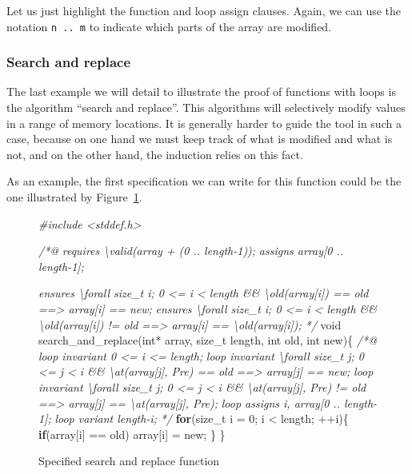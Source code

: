 \documentclass[12pt,francais,]{scrbook}
\newenvironment{Shaded}{}{}
\newcommand{\KeywordTok}[1]{\textcolor[rgb]{0.00,0.44,0.13}{\textbf{{#1}}}}
\newcommand{\DataTypeTok}[1]{\textcolor[rgb]{0.56,0.13,0.00}{{#1}}}
\newcommand{\DecValTok}[1]{\textcolor[rgb]{0.25,0.63,0.44}{{#1}}}
\newcommand{\CommentTok}[1]{\textcolor[rgb]{0.38,0.63,0.69}{\textit{{#1}}}}
\newcommand{\NormalTok}[1]{{#1}}
\begin{document}
Let us just highlight the function and loop assign clauses. Again, we
can use the notation \texttt{n\ ..\ m} to indicate which parts of the
array are modified.

\subsubsection{Search and replace}\label{search-and-replace}

The last example we will detail to illustrate the proof of functions
with loops is the algorithm ``search and replace''. This algorithms will
selectively modify values in a range of memory locations. It is
generally harder to guide the tool in such a case, because on one hand
we must keep track of what is modified and what is not, and on the other
hand, the induction relies on this fact.

As an example, the first specification we can write for this function
could be the one illustrated by Figure~\ref{fig:4-4-2-2-sar}.

\begin{figure}[htbp]
  \centering
\begin{footnotesize}\begin{Shaded}
\begin{Highlighting}[]
\CommentTok{#include <stddef.h>}

\CommentTok{/*@}
\CommentTok{  requires \textbackslash{}valid(array + (0 .. length-1));}
\CommentTok{  assigns array[0 .. length-1];}

\CommentTok{  ensures \textbackslash{}forall size_t i; 0 <= i < length && \textbackslash{}old(array[i]) == old}
\CommentTok{             ==> array[i] == new;}
\CommentTok{  ensures \textbackslash{}forall size_t i; 0 <= i < length && \textbackslash{}old(array[i]) != old }
\CommentTok{             ==> array[i] == \textbackslash{}old(array[i]);}
\CommentTok{*/}
\DataTypeTok{void} \NormalTok{search_and_replace(}\DataTypeTok{int}\NormalTok{* array, size_t length, }\DataTypeTok{int} \NormalTok{old, }\DataTypeTok{int} \NormalTok{new)\{}
  \CommentTok{/*@}
\CommentTok{    loop invariant 0 <= i <= length;}
\CommentTok{    loop invariant \textbackslash{}forall size_t j; 0 <= j < i && \textbackslash{}at(array[j], Pre) == old }
\CommentTok{                     ==> array[j] == new;}
\CommentTok{    loop invariant \textbackslash{}forall size_t j; 0 <= j < i && \textbackslash{}at(array[j], Pre) != old }
\CommentTok{                     ==> array[j] == \textbackslash{}at(array[j], Pre);}
\CommentTok{    loop assigns i, array[0 .. length-1];}
\CommentTok{    loop variant length-i;}
\CommentTok{  */}
  \KeywordTok{for}\NormalTok{(size_t i = }\DecValTok{0}\NormalTok{; i < length; ++i)\{}
    \KeywordTok{if}\NormalTok{(array[i] == old) array[i] = new;}
  \NormalTok{\}}
\NormalTok{\}}
\end{Highlighting}
\end{Shaded}\end{footnotesize}
\caption{Specified search and replace function}
\label{fig:4-4-2-2-sar}
\end{figure}
\end{document}
